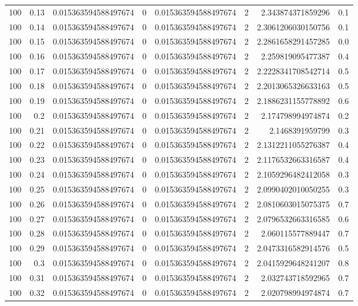 \documentclass[11pt]{article}
\begin{document}
\begin{center}
\begin{tabular}{rrrrrrrr}
100 & 0.13 & 0.015363594588497674 & 0 & 0.015363594588497674 & 2 & 2.343874371859296 & 0.1\\
100 & 0.14 & 0.015363594588497674 & 0 & 0.015363594588497674 & 2 & 2.3061206030150756 & 0.1\\
100 & 0.15 & 0.015363594588497674 & 0 & 0.015363594588497674 & 2 & 2.2861658291457285 & 0.0\\
100 & 0.16 & 0.015363594588497674 & 0 & 0.015363594588497674 & 2 & 2.259819095477387 & 0.4\\
100 & 0.17 & 0.015363594588497674 & 0 & 0.015363594588497674 & 2 & 2.2228341708542714 & 0.5\\
100 & 0.18 & 0.015363594588497674 & 0 & 0.015363594588497674 & 2 & 2.2013065326633163 & 0.5\\
100 & 0.19 & 0.015363594588497674 & 0 & 0.015363594588497674 & 2 & 2.1886231155778892 & 0.6\\
100 & 0.2 & 0.015363594588497674 & 0 & 0.015363594588497674 & 2 & 2.174798994974874 & 0.2\\
100 & 0.21 & 0.015363594588497674 & 0 & 0.015363594588497674 & 2 & 2.1468391959799 & 0.3\\
100 & 0.22 & 0.015363594588497674 & 0 & 0.015363594588497674 & 2 & 2.1312211055276387 & 0.4\\
100 & 0.23 & 0.015363594588497674 & 0 & 0.015363594588497674 & 2 & 2.1176532663316587 & 0.4\\
100 & 0.24 & 0.015363594588497674 & 0 & 0.015363594588497674 & 2 & 2.1059296482412058 & 0.3\\
100 & 0.25 & 0.015363594588497674 & 0 & 0.015363594588497674 & 2 & 2.0990402010050255 & 0.3\\
100 & 0.26 & 0.015363594588497674 & 0 & 0.015363594588497674 & 2 & 2.0810603015075375 & 0.7\\
100 & 0.27 & 0.015363594588497674 & 0 & 0.015363594588497674 & 2 & 2.0796532663316585 & 0.6\\
100 & 0.28 & 0.015363594588497674 & 0 & 0.015363594588497674 & 2 & 2.060115577889447 & 0.7\\
100 & 0.29 & 0.015363594588497674 & 0 & 0.015363594588497674 & 2 & 2.0473316582914576 & 0.5\\
100 & 0.3 & 0.015363594588497674 & 0 & 0.015363594588497674 & 2 & 2.0415929648241207 & 0.8\\
100 & 0.31 & 0.015363594588497674 & 0 & 0.015363594588497674 & 2 & 2.032743718592965 & 0.7\\
100 & 0.32 & 0.015363594588497674 & 0 & 0.015363594588497674 & 2 & 2.020798994974874 & 0.7\\

\end{tabular}
\end{center}
\end{document}

